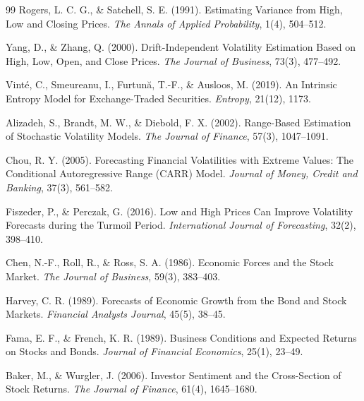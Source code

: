 ﻿\documentclass[11pt,a4paper]{article}
\begin{document}
\begin{thebibliography}{99}
Rogers, L. C. G., \& Satchell, S. E. (1991).
\newblock Estimating Variance from High, Low and Closing Prices.
\newblock \textit{The Annals of Applied Probability}, 1(4), 504--512.

Yang, D., \& Zhang, Q. (2000).
\newblock Drift-Independent Volatility Estimation Based on High, Low, Open, and Close Prices.
\newblock \textit{The Journal of Business}, 73(3), 477--492.

Vint\'e, C., Smeureanu, I., Furtun\u{a}, T.-F., \& Ausloos, M. (2019).
\newblock An Intrinsic Entropy Model for Exchange-Traded Securities.
\newblock \textit{Entropy}, 21(12), 1173.

Alizadeh, S., Brandt, M. W., \& Diebold, F. X. (2002).
\newblock Range-Based Estimation of Stochastic Volatility Models.
\newblock \textit{The Journal of Finance}, 57(3), 1047--1091.

Chou, R. Y. (2005).
\newblock Forecasting Financial Volatilities with Extreme Values: The Conditional Autoregressive Range (CARR) Model.
\newblock \textit{Journal of Money, Credit and Banking}, 37(3), 561--582.

Fiszeder, P., \& Perczak, G. (2016).
\newblock Low and High Prices Can Improve Volatility Forecasts during the Turmoil Period.
\newblock \textit{International Journal of Forecasting}, 32(2), 398--410.

Chen, N.-F., Roll, R., \& Ross, S. A. (1986).
\newblock Economic Forces and the Stock Market.
\newblock \textit{The Journal of Business}, 59(3), 383--403.

Harvey, C. R. (1989).
\newblock Forecasts of Economic Growth from the Bond and Stock Markets.
\newblock \textit{Financial Analysts Journal}, 45(5), 38--45.

Fama, E. F., \& French, K. R. (1989).
\newblock Business Conditions and Expected Returns on Stocks and Bonds.
\newblock \textit{Journal of Financial Economics}, 25(1), 23--49.

Baker, M., \& Wurgler, J. (2006).
\newblock Investor Sentiment and the Cross-Section of Stock Returns.
\newblock \textit{The Journal of Finance}, 61(4), 1645--1680.


\end{thebibliography}
\end{document}
